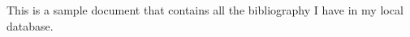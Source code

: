 \documentclass[12pt]{article}
\begin{document}
	This is a sample document that contains all the bibliography I have in my local database.
	\nocite{*}
	
	
	
\end{document}
